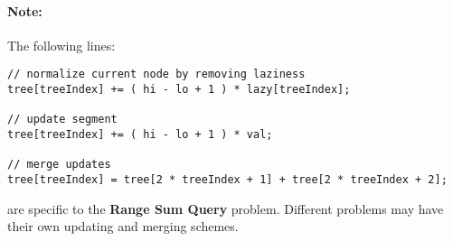 \paragraph{Note:} The following lines:

\begin{lstlisting}[style=customc, caption={Notes}]
// normalize current node by removing laziness
tree[treeIndex] += ( hi - lo + 1 ) * lazy[treeIndex];

// update segment
tree[treeIndex] += ( hi - lo + 1 ) * val;

// merge updates
tree[treeIndex] = tree[2 * treeIndex + 1] + tree[2 * treeIndex + 2];
\end{lstlisting}

are specific to the \textbf{Range Sum Query} problem. Different problems may have their own updating and merging schemes.
